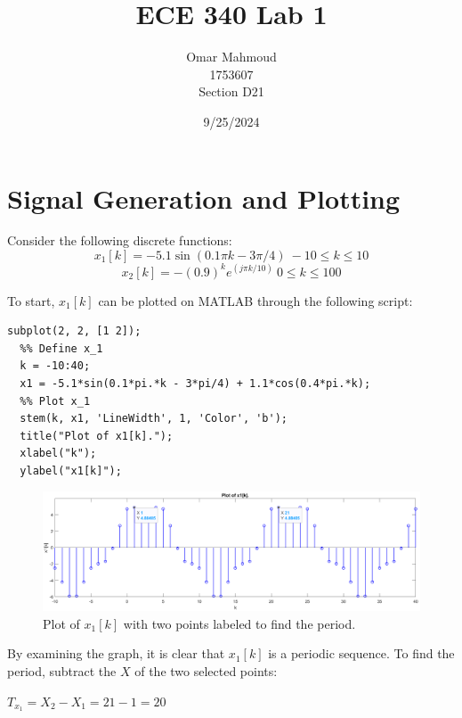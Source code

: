 \documentclass[a4paper, 10pt]{article}
\title{ECE 340 Lab 1}
\author{Omar Mahmoud\\1753607\\Section D21}
\date{9/25/2024}
\begin{document}
\thispagestyle{empty}
\vfill
\maketitle
\vfill

\newpage

\section{Signal Generation and Plotting}

Consider the following discrete functions:
\begin{equation}
  x_1[k] = -5.1\sin(0.1\pi k-3\pi/4)\ -10\leq k\leq 10
\end{equation}
\begin{equation}
  x_2[k] = -(0.9)^ke^{(j\pi k/10)}\ 0\leq k\leq 100
\end{equation}

\noindent To start, $x_1[k]$ can be plotted on MATLAB through the following script:
\begin{lstlisting}[style=Matlab-editor, basicstyle=\small\ttfamily]
  subplot(2, 2, [1 2]);
  %% Define x_1
  k = -10:40;
  x1 = -5.1*sin(0.1*pi.*k - 3*pi/4) + 1.1*cos(0.4*pi.*k);
  %% Plot x_1
  stem(k, x1, 'LineWidth', 1, 'Color', 'b');
  title("Plot of x1[k].");
  xlabel("k");
  ylabel("x1[k]");
\end{lstlisting}
\begin{figure}[H]
  \centering
  \includegraphics[width=15cm]{images/x1_plot.png}
  \caption{Plot of $x_1[k]$ with two points labeled to find the period.}
\end{figure}
By examining the graph, it is clear that $x_1[k]$ is a periodic sequence. To find the period, subtract 
the $X$ of the two selected points:
\begin{center}
  $T_{x_1} = X_2-X_1 = 21-1 = 20$ 
\end{center}
\end{document}
